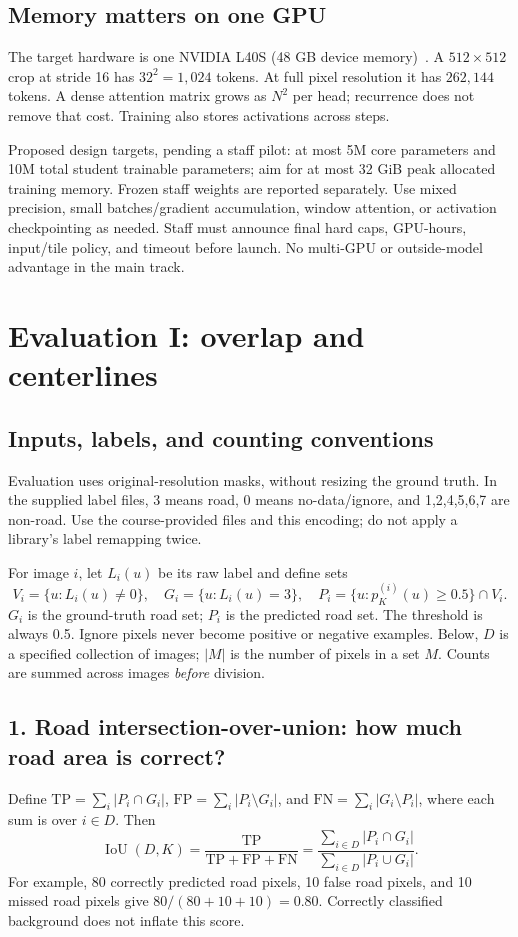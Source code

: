 \documentclass[11pt,letterpaper]{article}
\newcommand{\page}[1]{\clearpage\section{#1}}
\newcommand{\smallnote}[1]{{\small\color{graytext}#1\par}}
\begin{document}
\subsection{Memory matters on one GPU}
The target hardware is one NVIDIA L40S (48 GB device memory)~\cite{l40s}. A $512\times512$ crop at stride 16 has $32^2=1{,}024$ tokens. At full pixel resolution it has $262{,}144$ tokens. A dense attention matrix grows as $N^2$ per head; recurrence does not remove that cost. Training also stores activations across steps.

\smallnote{Proposed design targets, pending a staff pilot: at most 5M core parameters and 10M total student trainable parameters; aim for at most 32 GiB peak allocated training memory. Frozen staff weights are reported separately. Use mixed precision, small batches/gradient accumulation, window attention, or activation checkpointing as needed. Staff must announce final hard caps, GPU-hours, input/tile policy, and timeout before launch. No multi-GPU or outside-model advantage in the main track.}

\page{Evaluation I: overlap and centerlines}
\subsection{Inputs, labels, and counting conventions}
Evaluation uses original-resolution masks, without resizing the ground truth. In the supplied label files, 3 means road, 0 means no-data/ignore, and 1,2,4,5,6,7 are non-road. Use the course-provided files and this encoding; do not apply a library's label remapping twice.

For image $i$, let $L_i(u)$ be its raw label and define sets
\begin{equation}
 V_i=\{u:L_i(u)\ne0\},\quad G_i=\{u:L_i(u)=3\},\quad
 P_i=\{u:p_K^{(i)}(u)\geq0.5\}\cap V_i.
\end{equation}
$G_i$ is the ground-truth road set; $P_i$ is the predicted road set. The threshold is always 0.5. Ignore pixels never become positive or negative examples. Below, $D$ is a specified collection of images; $|M|$ is the number of pixels in a set $M$. Counts are summed across images \emph{before} division.

\subsection{1. Road intersection-over-union: how much road area is correct?}
Define $\mathrm{TP}=\sum_i|P_i\cap G_i|$, $\mathrm{FP}=\sum_i|P_i\setminus G_i|$, and $\mathrm{FN}=\sum_i|G_i\setminus P_i|$, where each sum is over $i\in D$. Then
\begin{equation}
 \operatorname{IoU}(D,K)=\frac{\mathrm{TP}}{\mathrm{TP}+\mathrm{FP}+\mathrm{FN}}
 =\frac{\sum_{i\in D}|P_i\cap G_i|}{\sum_{i\in D}|P_i\cup G_i|}.
\end{equation}
For example, 80 correctly predicted road pixels, 10 false road pixels, and 10 missed road pixels give $80/(80+10+10)=0.80$. Correctly classified background does not inflate this score.
\end{document}
